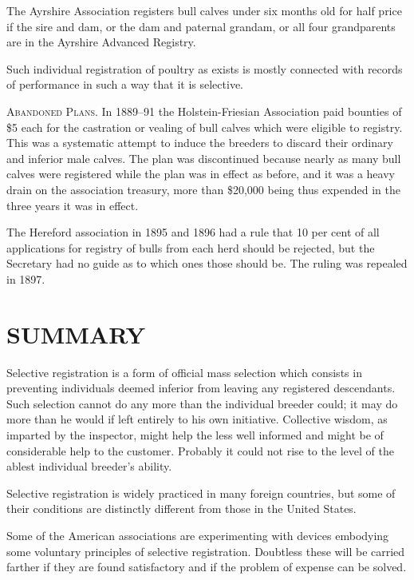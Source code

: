 The Ayrshire Association registers bull calves under six months old
for half price if the sire and dam, or the dam and paternal grandam, or
all four grandparents are in the Ayrshire Advanced Registry.

Such individual registration of poultry as exists is mostly connected
with records of performance in such a way that it is selective.

\textsc{Abandoned Plans}. In 1889--91 the Holstein-Friesian Association
paid bounties of \$5 each for the castration or vealing of bull calves
which were eligible to registry. This was a systematic attempt to induce
the breeders to discard their ordinary and inferior male calves. The
plan was discontinued because nearly as many bull calves were registered
while the plan was in effect as before, and it was a heavy drain on
the association treasury, more than \$20,000 being thus expended in the
three years it was in effect.

The Hereford association in 1895 and 1896 had a rule that 10 per
cent of all applications for registry of bulls from each herd should be
rejected, but the Secretary had no guide as to which ones those should
be. The ruling was repealed in 1897.

\section*{SUMMARY}

Selective registration is a form of official mass selection which consists
in preventing individuals deemed inferior from leaving any registered
descendants. Such selection cannot do any more than the individual
breeder could; it may do more than he would if left entirely to
his own initiative. Collective wisdom, as imparted by the inspector,
might help the less well informed and might be of considerable help to
the customer. Probably it could not rise to the level of the ablest individual
breeder's ability.

Selective registration is widely practiced in many foreign countries,
but some of their conditions are distinctly different from those in the
United States.

Some of the American associations are experimenting with devices
embodying some voluntary principles of selective registration. Doubtless
these will be carried farther if they are found satisfactory and if the
problem of expense can be solved.

